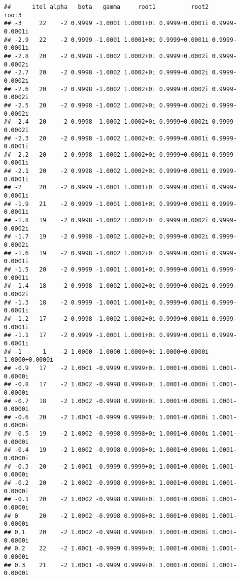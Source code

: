 \documentclass[
  12pt,
]{article}
\begin{document}
\begin{verbatim}
##      itel alpha   beta   gamma     root1          root2          root3
## -3     22    -2 0.9999 -1.0001 1.0001+0i 0.9999+0.0001i 0.9999-0.0001i
## -2.9   22    -2 0.9999 -1.0001 1.0001+0i 0.9999+0.0001i 0.9999-0.0001i
## -2.8   20    -2 0.9998 -1.0002 1.0002+0i 0.9999+0.0002i 0.9999-0.0002i
## -2.7   20    -2 0.9998 -1.0002 1.0002+0i 0.9999+0.0002i 0.9999-0.0002i
## -2.6   20    -2 0.9998 -1.0002 1.0002+0i 0.9999+0.0002i 0.9999-0.0002i
## -2.5   20    -2 0.9998 -1.0002 1.0002+0i 0.9999+0.0002i 0.9999-0.0002i
## -2.4   20    -2 0.9998 -1.0002 1.0002+0i 0.9999+0.0002i 0.9999-0.0002i
## -2.3   20    -2 0.9998 -1.0002 1.0002+0i 0.9999+0.0001i 0.9999-0.0001i
## -2.2   20    -2 0.9998 -1.0002 1.0002+0i 0.9999+0.0001i 0.9999-0.0001i
## -2.1   20    -2 0.9998 -1.0002 1.0002+0i 0.9999+0.0001i 0.9999-0.0001i
## -2     20    -2 0.9999 -1.0001 1.0001+0i 0.9999+0.0001i 0.9999-0.0001i
## -1.9   21    -2 0.9999 -1.0001 1.0001+0i 0.9999+0.0001i 0.9999-0.0001i
## -1.8   19    -2 0.9998 -1.0002 1.0002+0i 0.9999+0.0002i 0.9999-0.0002i
## -1.7   19    -2 0.9998 -1.0002 1.0002+0i 0.9999+0.0002i 0.9999-0.0002i
## -1.6   19    -2 0.9998 -1.0002 1.0002+0i 0.9999+0.0001i 0.9999-0.0001i
## -1.5   20    -2 0.9999 -1.0001 1.0001+0i 0.9999+0.0001i 0.9999-0.0001i
## -1.4   18    -2 0.9998 -1.0002 1.0002+0i 0.9999+0.0002i 0.9999-0.0002i
## -1.3   18    -2 0.9999 -1.0001 1.0001+0i 0.9999+0.0001i 0.9999-0.0001i
## -1.2   17    -2 0.9998 -1.0002 1.0002+0i 0.9999+0.0001i 0.9999-0.0001i
## -1.1   17    -2 0.9999 -1.0001 1.0001+0i 0.9999+0.0001i 0.9999-0.0001i
## -1      1    -2 1.0000 -1.0000 1.0000+0i 1.0000+0.0000i 1.0000+0.0000i
## -0.9   17    -2 1.0001 -0.9999 0.9999+0i 1.0001+0.0000i 1.0001-0.0000i
## -0.8   17    -2 1.0002 -0.9998 0.9998+0i 1.0001+0.0000i 1.0001-0.0000i
## -0.7   18    -2 1.0002 -0.9998 0.9998+0i 1.0001+0.0000i 1.0001-0.0000i
## -0.6   20    -2 1.0001 -0.9999 0.9999+0i 1.0001+0.0000i 1.0001-0.0000i
## -0.5   19    -2 1.0002 -0.9998 0.9998+0i 1.0001+0.0000i 1.0001-0.0000i
## -0.4   19    -2 1.0002 -0.9998 0.9998+0i 1.0001+0.0000i 1.0001-0.0000i
## -0.3   20    -2 1.0001 -0.9999 0.9999+0i 1.0001+0.0000i 1.0001-0.0000i
## -0.2   20    -2 1.0002 -0.9998 0.9998+0i 1.0001+0.0000i 1.0001-0.0000i
## -0.1   20    -2 1.0002 -0.9998 0.9998+0i 1.0001+0.0000i 1.0001-0.0000i
## 0      20    -2 1.0002 -0.9998 0.9998+0i 1.0001+0.0000i 1.0001-0.0000i
## 0.1    20    -2 1.0002 -0.9998 0.9998+0i 1.0001+0.0000i 1.0001-0.0000i
## 0.2    22    -2 1.0001 -0.9999 0.9999+0i 1.0001+0.0000i 1.0001-0.0000i
## 0.3    21    -2 1.0001 -0.9999 0.9999+0i 1.0001+0.0000i 1.0001-0.0000i

\end{verbatim}
\end{document}
